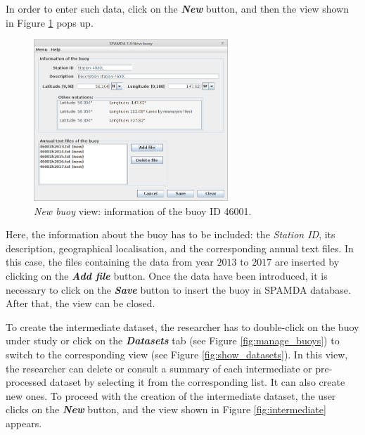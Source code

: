 \documentclass[energies,article,accept,moreauthors,pdftex]{Definitions/mdpi}
\begin{document}
\begin{paracol}{2}
\switchcolumn
			
			In order to enter such data, click on the \textbf{\textit{New}} button, and then the view shown in Figure \ref{fig:new_buoy} pops up.

			\begin{figure}[H]
				\includegraphics[width=0.65\textwidth]{figures/FigureNew_buoy.png}
				\caption{\textit{New buoy} view: information of the buoy ID 46001.}\label{fig:new_buoy}
			\end{figure}
			
			Here, the information about the buoy has to be included: the \textit{Station ID}, its description, geographical localisation, and the corresponding annual text files. In this case, the files containing the data from year $2013$ to $2017$ are inserted by clicking on the \textbf{\textit{Add file}} button. Once the data have been introduced, it is necessary to click on the \textbf{\textit{Save}} button to insert the buoy in SPAMDA database. After that, the view can be closed.  
		
			
			
			To create the intermediate dataset, the researcher has to double-click on the buoy under study or click on the \textbf{\textit{Datasets}} tab (see Figure \ref{fig:manage_buoys}) to switch to the corresponding view (see Figure \ref{fig:show_datasets}). In this view, the researcher can delete or consult a summary of each intermediate or pre-processed dataset by selecting it from the corresponding list. It can also create new ones. To proceed with the creation of the intermediate dataset, the user clicks on the \textbf{\textit{New}} button, and the view shown in Figure \ref{fig:intermediate} appears. 
			
			
			

\end{paracol}
\end{document}
